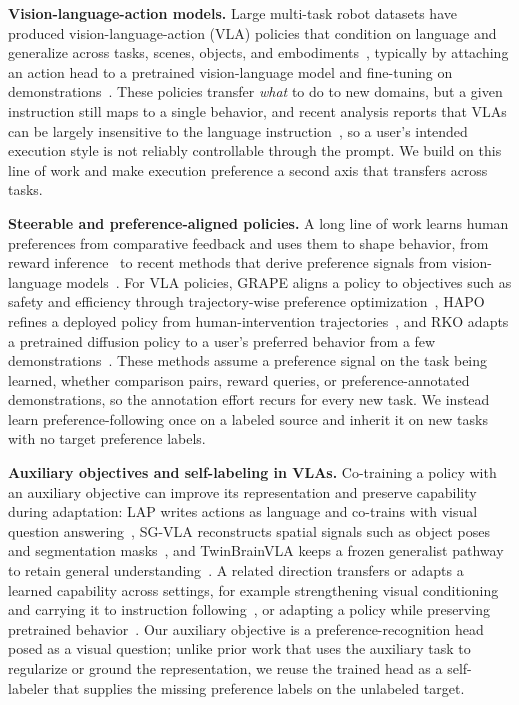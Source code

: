 \documentclass{article}
\begin{document}
\textbf{Vision-language-action models.}
Large multi-task robot datasets have produced vision-language-action (VLA) policies that condition on language and generalize across tasks, scenes, objects, and embodiments~\citep{o2024open, kim2024openvla, black2024pi0}, typically by attaching an action head to a pretrained vision-language model and fine-tuning on demonstrations~\citep{kim2024openvla, kim2025oft}.
These policies transfer \emph{what} to do to new domains, but a given instruction still maps to a single behavior, and recent analysis reports that VLAs can be largely insensitive to the language instruction~\citep{liberoplus}, so a user's intended execution style is not reliably controllable through the prompt.
We build on this line of work and make execution preference a second axis that transfers across tasks.

\textbf{Steerable and preference-aligned policies.}
A long line of work learns human preferences from comparative feedback and uses them to shape behavior, from reward inference~\citep{Frnkranz2010PreferenceLA, Sadigh2017ActivePL, Peng2025UUPL} to recent methods that derive preference signals from vision-language models~\citep{ghosh2025prefvlm, li2025commethumaninducedconflictsmobile, singh2025varp}.
For VLA policies, GRAPE aligns a policy to objectives such as safety and efficiency through trajectory-wise preference optimization~\citep{zhang2024grape}, HAPO refines a deployed policy from human-intervention trajectories~\citep{xia2025hapo}, and RKO adapts a pretrained diffusion policy to a user's preferred behavior from a few demonstrations~\citep{moletta2026rko}.
These methods assume a preference signal on the task being learned, whether comparison pairs, reward queries, or preference-annotated demonstrations, so the annotation effort recurs for every new task.
We instead learn preference-following once on a labeled source and inherit it on new tasks with no target preference labels.

\textbf{Auxiliary objectives and self-labeling in VLAs.}
Co-training a policy with an auxiliary objective can improve its representation and preserve capability during adaptation: LAP writes actions as language and co-trains with visual question answering~\citep{zha2026lap}, SG-VLA reconstructs spatial signals such as object poses and segmentation masks~\citep{tu2026sgvla}, and TwinBrainVLA keeps a frozen generalist pathway to retain general understanding~\citep{yu2026twinbrainvla}.
A related direction transfers or adapts a learned capability across settings, for example strengthening visual conditioning and carrying it to instruction following~\citep{chen2026vista}, or adapting a policy while preserving pretrained behavior~\citep{zhong2026vlaopd}.
Our auxiliary objective is a preference-recognition head posed as a visual question; unlike prior work that uses the auxiliary task to regularize or ground the representation, we reuse the trained head as a self-labeler that supplies the missing preference labels on the unlabeled target.
\end{document}
